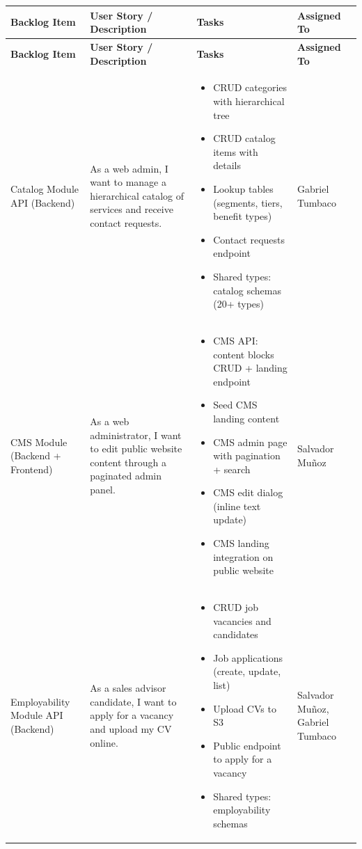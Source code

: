 \documentclass[letterpaper%
, oneside%
, 12pt%
, memoireprojet%
, english%
,creativecommons,hyperref, withAlgo2e %
]{thETS}
\begin{document}
\begingroup
\setlength{\LTleft}{-1.2cm plus -1fill}
\setlength{\LTright}{\LTleft}
\begin{longtable}{|p{3.2cm}|p{4.4cm}|p{5.4cm}|p{3.0cm}|}
\hline
\textbf{Backlog Item} & \textbf{User Story / Description} & \textbf{Tasks} & \textbf{Assigned To} \\ \hline
\endfirsthead
\hline
\textbf{Backlog Item} & \textbf{User Story / Description} & \textbf{Tasks} & \textbf{Assigned To} \\ \hline
\endhead
Catalog Module API (Backend) & As a web admin, I want to manage a hierarchical catalog of services and receive contact requests. & \begin{itemize}\setlength{\itemsep}{2pt}
    \item CRUD categories with hierarchical tree
    \item CRUD catalog items with details
    \item Lookup tables (segments, tiers, benefit types)
    \item Contact requests endpoint
    \item Shared types: catalog schemas (20+ types)
\end{itemize} & Gabriel Tumbaco \\ \hline

CMS Module (Backend + Frontend) & As a web administrator, I want to edit public website content through a paginated admin panel. & \begin{itemize}\setlength{\itemsep}{2pt}
    \item CMS API: content blocks CRUD + landing endpoint
    \item Seed CMS landing content
    \item CMS admin page with pagination + search
    \item CMS edit dialog (inline text update)
    \item CMS landing integration on public website
\end{itemize} & Salvador Muñoz \\ \hline

Employability Module API (Backend) & As a sales advisor candidate, I want to apply for a vacancy and upload my CV online. & \begin{itemize}\setlength{\itemsep}{2pt}
    \item CRUD job vacancies and candidates
    \item Job applications (create, update, list)
    \item Upload CVs to S3
    \item Public endpoint to apply for a vacancy
    \item Shared types: employability schemas
\end{itemize} & Salvador Muñoz, Gabriel Tumbaco \\ \hline


\end{longtable}
\end{document}
